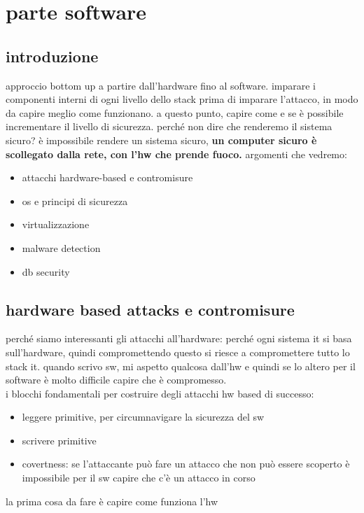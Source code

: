 \documentclass[12pt, oneside]{extbook} %
\begin{document}

\part{parte software}

\chapter{introduzione}
approccio bottom up a partire dall'hardware fino al software. imparare i componenti interni di ogni livello dello stack prima di imparare l'attacco, in modo da capire meglio come funzionano. a questo punto, capire come e se è possibile incrementare il livello di sicurezza. perché non dire che renderemo il sistema sicuro? è impossibile rendere un sistema sicuro, \textbf{un computer sicuro è scollegato dalla rete, con l'hw che prende fuoco.}
argomenti che vedremo:
\begin{itemize}
\item attacchi hardware-based e contromisure
\item os e principi di sicurezza
\item virtualizzazione
\item malware detection
\item db security
\end{itemize}

\chapter{hardware based attacks e contromisure}
perché siamo interessanti gli attacchi all'hardware: perché ogni sistema it si basa sull'hardware, quindi compromettendo questo si riesce a compromettere tutto lo stack it. quando scrivo sw, mi aspetto qualcosa dall'hw e quindi se lo altero per il software è molto difficile capire che è compromesso.\\ i blocchi fondamentali per costruire degli attacchi hw based di successo:
\begin{itemize}
\item leggere primitive, per circumnavigare la sicurezza del sw
\item scrivere primitive
\item covertness: se l'attaccante può fare un attacco che non può essere scoperto è impossibile per il sw capire che c'è un attacco in corso
\end{itemize}
la prima cosa da fare è capire come funziona l'hw
\end{document}
